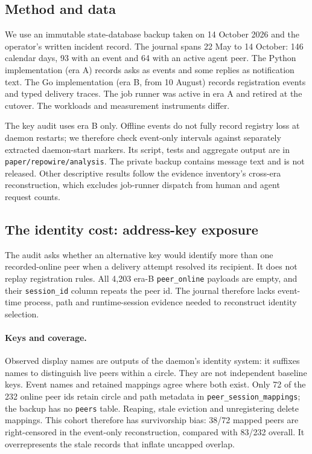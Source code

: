 \documentclass[10pt,twocolumn]{article}
\newcommand{\code}[1]{\texttt{#1}}
\begin{document}
\subsection{Method and data}
\label{sec:method}

We use an immutable state-database backup taken on 14 October 2026 and the operator's written incident record. The journal spans 22 May to 14 October: 146 calendar days, 93 with an event and 64 with an active agent peer. The Python implementation (era A) records asks as events and some replies as notification text. The Go implementation (era B, from 10 August) records registration events and typed delivery traces. The job runner was active in era A and retired at the cutover. The workloads and measurement instruments differ.

The key audit uses era B only. Offline events do not fully record registry loss at daemon restarts; we therefore check event-only intervals against separately extracted daemon-start markers. Its script, tests and aggregate output are in \code{paper/repowire/analysis}. The private backup contains message text and is not released. Other descriptive results follow the evidence inventory's cross-era reconstruction, which excludes job-runner dispatch from human and agent request counts.

\subsection{The identity cost: address-key exposure}
\label{sec:lifecycle}

The audit asks whether an alternative key would identify more than one recorded-online peer when a delivery attempt resolved its recipient. It does not replay registration rules. All 4,203 era-B \code{peer\_online} payloads are empty, and their \code{session\_id} column repeats the peer id. The journal therefore lacks event-time process, path and runtime-session evidence needed to reconstruct identity selection.

\paragraph{Keys and coverage.}
Observed display names are outputs of the daemon's identity system: it suffixes names to distinguish live peers within a circle. They are not independent baseline keys. Event names and retained mappings agree where both exist. Only 72 of the 232 online peer ids retain circle and path metadata in \code{peer\_session\_mappings}; the backup has no \code{peers} table. Reaping, stale eviction and unregistering delete mappings. This cohort therefore has survivorship bias: 38/72 mapped peers are right-censored in the event-only reconstruction, compared with 83/232 overall. It overrepresents the stale records that inflate uncapped overlap.
\end{document}
